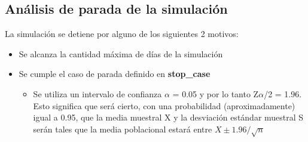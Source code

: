 \documentclass{article}
\begin{document}
			\subsection*{Análisis de parada de la simulación}
			La simulación se detiene por alguno de los siguientes 2 motivos:
			\begin{itemize}[left=3em]
				\item Se alcanza la cantidad máxima de días de la simulación
				\item Se cumple el caso de parada definido en \textbf{stop\_case}
				\begin{itemize}
					\item Se utiliza un intervalo de confianza $\alpha$ = 0.05 y por lo tanto Z{$\alpha$}/2 = 1.96. Esto significa que será cierto, con una probabilidad (aproximadamente) igual a 0.95, que la media muestral X y la desviación estándar muestral S serán tales que la media poblacional estará entre $X \pm 1.96/\sqrt{n}$
				\end{itemize}
			\end{itemize}
			
			
		
\end{document}
